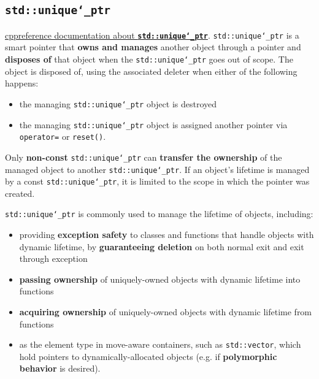\subsection{\texttt{std::unique\char`_ptr}}
    \href{https://en.cppreference.com/w/cpp/memory/unique_ptr}{cppreference documentation about \textbf{\texttt{std::unique\char`_ptr}}}.
    \newline
    \texttt{std::unique\char`_ptr} is a smart pointer that \textbf{owns and manages} 
    another object through a pointer and \textbf{disposes of} that object 
    when the \texttt{std::unique\char`_ptr} goes out of scope.
    \newline
    The object is disposed of, using the associated deleter when either 
    of the following happens:
    \begin{itemize}
        \item the managing \texttt{std::unique\char`_ptr} object is destroyed
        \item the managing \texttt{std::unique\char`_ptr} object is assigned 
        another pointer
        \newline 
        via \texttt{operator=} or \texttt{reset()}. 
    \end{itemize}

Only \textbf{non-const} \texttt{std::unique\char`_ptr} can 
\textbf{transfer the ownership} of the managed object to another 
\texttt{std::unique\char`_ptr}.
\newline
If an object's lifetime is managed by a const \texttt{std::unique\char`_ptr}, 
it is limited to the scope in which the pointer was created.

\texttt{std::unique\char`_ptr} is commonly used to manage the lifetime 
of objects, including:
    \begin{itemize}
        \item providing \textbf{exception safety} to classes and functions 
        that handle objects with dynamic lifetime, 
        by \textbf{guaranteeing deletion} on both normal exit and 
        exit through exception 

        \item \textbf{passing ownership} of uniquely-owned objects with 
        dynamic lifetime into functions 

        \item \textbf{acquiring ownership} of uniquely-owned objects 
        with dynamic lifetime from functions 

        \item as the element type in move-aware containers, 
        such as \texttt{std::vector}, which hold pointers to 
        dynamically-allocated objects
        (e.g. if \textbf{polymorphic behavior} is desired).             
    \end{itemize}

